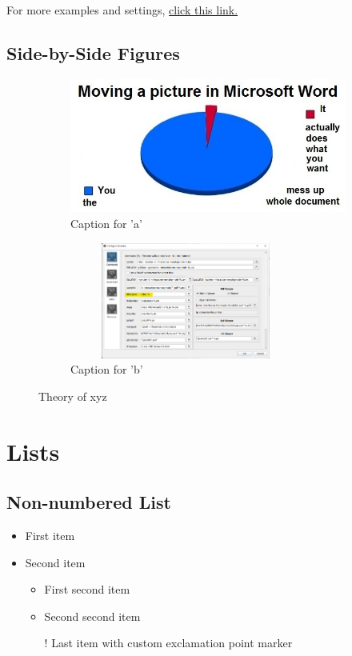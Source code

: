 \documentclass{article}
\begin{document}
For more examples and settings, \href{http://overleaf.com/learn/latex/Inserting_Images}{click this link.}


\subsection{Side-by-Side Figures}
\begin{figure}[h]
\centering
\begin{subfigure}{0.5\textwidth}
  \centering
  \includegraphics[width=0.7\linewidth]{latex-meme.jpg}
  \caption{Caption for 'a' \cite{Maxim}}
  \label{fig:sub1}
\end{subfigure}%
\begin{subfigure}{0.5\textwidth}
  \centering
  \includegraphics[width=3in, height=1.5in]{screenshot_biber_setting.png}
  \caption{Caption for 'b'}
  \label{fig:sub2}
\end{subfigure}
\caption{Theory of xyz}
\label{fig:test}
\end{figure}

\pagebreak


\section{Lists}

\subsection{Non-numbered List}
\begin{itemize}
	\item First item
	\item Second item
	\begin{itemize}
		\item First second item
		\item Second second item
	\item[!] Last item with custom exclamation point marker	
	\end{itemize}
\end{itemize}
\end{document}
